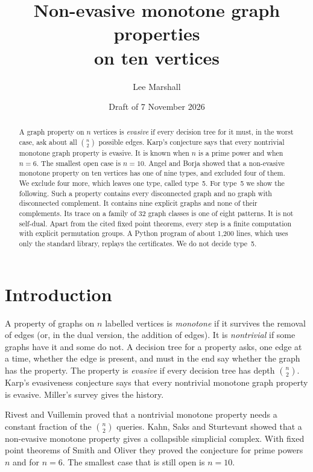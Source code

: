 \documentclass[11pt]{article}
\title{Non-evasive monotone graph properties\\on ten vertices}
\author{Lee Marshall}
\date{Draft of 7 November 2026}
\theoremstyle{plain}
\theoremstyle{definition}
\theoremstyle{remark}
\begin{document}
\maketitle

\begin{abstract}
\noindent
A graph property on $n$ vertices is \emph{evasive} if every decision tree for it must, in the worst case, ask about all $\binom n2$ possible edges.
Karp's conjecture says that every nontrivial monotone graph property is evasive.
It is known when $n$ is a prime power and when $n=6$.
The smallest open case is $n=10$.
Angel and Borja showed that a non-evasive monotone property on ten vertices has one of nine types, and excluded four of them.
We exclude four more, which leaves one type, called type~5.
For type~5 we show the following.
Such a property contains every disconnected graph and no graph with disconnected complement.
It contains nine explicit graphs and none of their complements.
Its trace on a family of $32$ graph classes is one of eight patterns.
It is not self-dual.
Apart from the cited fixed point theorems, every step is a finite computation with explicit permutation groups.
A Python program of about 1,200 lines, which uses only the standard library, replays the certificates.
We do not decide type~5.
\end{abstract}

\section{Introduction}

A property of graphs on $n$ labelled vertices is \emph{monotone} if it survives the removal of edges (or, in the dual version, the addition of edges).
It is \emph{nontrivial} if some graphs have it and some do not.
A decision tree for a property asks, one edge at a time, whether the edge is present, and must in the end say whether the graph has the property.
The property is \emph{evasive} if every decision tree has depth $\binom n2$.
Karp's evasiveness conjecture says that every nontrivial monotone graph property is evasive.
Miller's survey \cite{Mil} gives the history.

Rivest and Vuillemin \cite{RV} proved that a nontrivial monotone property needs a constant fraction of the $\binom n2$ queries.
Kahn, Saks and Sturtevant \cite{KSS} showed that a non-evasive monotone property gives a collapsible simplicial complex.
With fixed point theorems of Smith and Oliver they proved the conjecture for prime powers $n$ and for $n=6$.
The smallest case that is still open is $n=10$.
\end{document}

